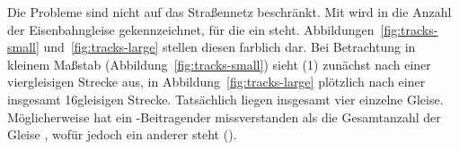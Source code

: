 \documentclass[../main/thesis.tex]{subfiles}
\begin{document}
\label{railway-case}

Die Probleme sind nicht auf das Straßennetz beschränkt.
Mit  wird in \osm{} die Anzahl der Eisenbahngleise gekennzeichnet, für die ein  steht.
Abbildungen~\ref{fig:tracks-small} und~\ref{fig:tracks-large} stellen diesen  farblich dar.
Bei Betrachtung in kleinem Maßstab (Abbildung~\ref{fig:tracks-small}) sieht (1) zunächst nach einer viergleisigen Strecke aus, in Abbildung~\ref{fig:tracks-large} plötzlich nach einer insgesamt 16gleisigen Strecke.
Tatsächlich liegen insgesamt vier einzelne Gleise.
Möglicherweise hat ein \osm-Beitragender  missverstanden als die Gesamtanzahl der Gleise , wofür jedoch ein anderer  steht ().

\end{document}
